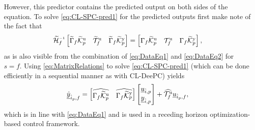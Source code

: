 However, this predictor contains the predicted output on both sides of the equation. To solve \eqref{eq:CL-SPC-pred1} for the predicted outputs first make note of the fact that~\citep{Houtzager2012}
\begin{align}\label{eq:MatrixRelations}
	\tHf\inv\begin{bmatrix}
		\widetilde{\Gamma}_f\tKp{u} & \widetilde{\mathcal{T}}_f^\mathrm{u} & \widetilde{\Gamma}_f\tKp{y}
	\end{bmatrix} =
	\begin{bmatrix}
		\Gamma_f\tKp{u} & \mathcal{T}_f^\mathrm{u} & \Gamma_f\tKp{y}
	\end{bmatrix},
\end{align}
as is also visible from the combination of \eqref{eq:DataEq1} and \eqref{eq:DataEq2} for $s=f$. Using \eqref{eq:MatrixRelations} to solve \eqref{eq:CL-SPC-pred1} (which can be done efficiently in a sequential manner as with \ac{CL-DeePC}) yields
\begin{align}\label{eq:CL-SPC-pred2}
		\underline{\hat{y}}_{\hat{i}_p,f}= \begin{bmatrix}\widehat{\Gamma_f\widetilde{\mathcal{K}}_{p}^{\mathrm{{u}}}} & \widehat{\Gamma_f\widetilde{\mathcal{K}}_{p}^{\mathrm{{y}}}} \end{bmatrix} 
		\begin{bmatrix}
			\underline{u}_{\hat{i},p}\\
			\underline{y}_{\hat{i},p}
		\end{bmatrix}+
		\widehat{\mathcal{T}_f^\mathrm{u}} 
		\underline{u}_{\hat{i}_p,f},
\end{align}
which is in line with \eqref{eq:DataEq1} and is used in a receding horizon optimization-based control framework.

